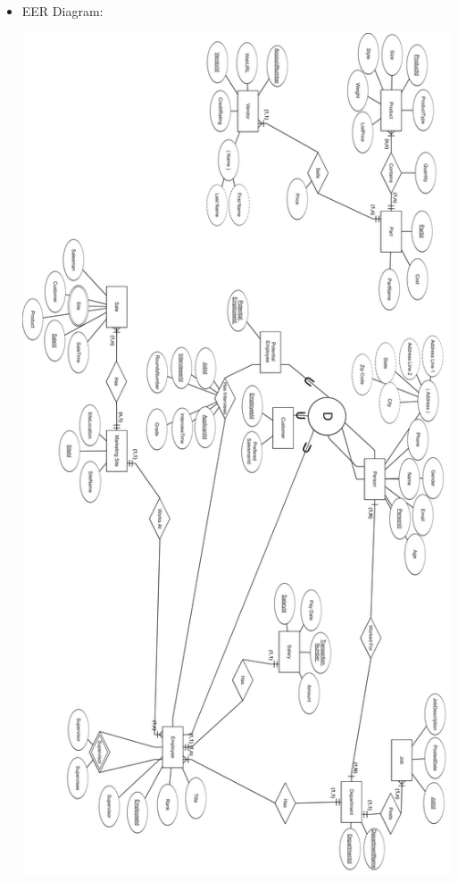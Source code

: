 \documentclass[12pt]{article}
\begin{document}
\begin{enumerate}
\begin{itemize}
				\item EER Diagram:
				\begin{center}
					\includegraphics[scale=.075]{completed_diags/eer_rot}
				\end{center}
			
			\end{itemize}


\end{enumerate}
\end{document}
